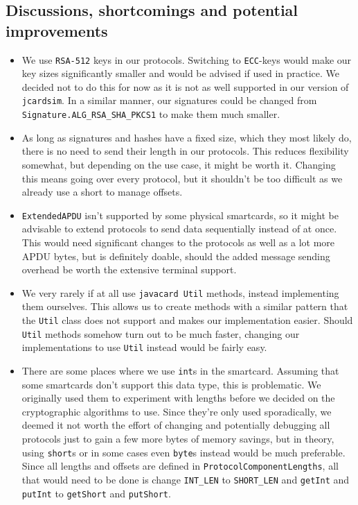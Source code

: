 \documentclass[a4paper]{article}
\begin{document}
\subsection{Discussions, shortcomings and potential improvements}
\begin{itemize}
    \item We use \texttt{RSA-512} keys in our protocols. Switching to \texttt{ECC}-keys would make our key sizes significantly smaller and would be advised if used in practice. We decided not to do this for now as it is not as well supported in our version of \texttt{jcardsim}. In a similar manner, our signatures could be changed from \texttt{Signature.ALG\_RSA\_SHA\_PKCS1} to make them much smaller.
    \item As long as signatures and hashes have a fixed size, which they most likely do, there is no need to send their length in our protocols. This reduces flexibility somewhat, but depending on the use case, it might be worth it. Changing this means going over every protocol, but it shouldn't be too difficult as we already use a short to manage offsets.
    \item \texttt{ExtendedAPDU} isn't supported by some physical smartcards, so it might be advisable to extend protocols to send data sequentially instead of at once. This would need significant changes to the protocols as well as a lot more APDU bytes, but is definitely doable, should the added message sending overhead be worth the extensive terminal support.
    \item We very rarely if at all use \texttt{javacard Util} methods, instead implementing them ourselves. This allows us to create methods with a similar pattern that the \texttt{Util} class does not support and makes our implementation easier. Should \texttt{Util} methods somehow turn out to be much faster, changing our implementations to use \texttt{Util} instead would be fairly easy. 
    \item There are some places where we use \texttt{int}s in the smartcard. Assuming that some smartcards don't support this data type, this is problematic. We originally used them to experiment with lengths before we decided on the cryptographic algorithms to use. Since they're only used sporadically, we deemed it not worth the effort of changing and potentially debugging all protocols just to gain a few more bytes of memory savings, but in theory, using \texttt{short}s or in some cases even \texttt{byte}s instead would be much preferable. Since all lengths and offsets are defined in \texttt{ProtocolComponentLengths}, all that would need to be done is change \texttt{INT\_LEN} to \texttt{SHORT\_LEN} and \texttt{getInt} and \texttt{putInt} to \texttt{getShort} and \texttt{putShort}.

\end{itemize}
\end{document}
